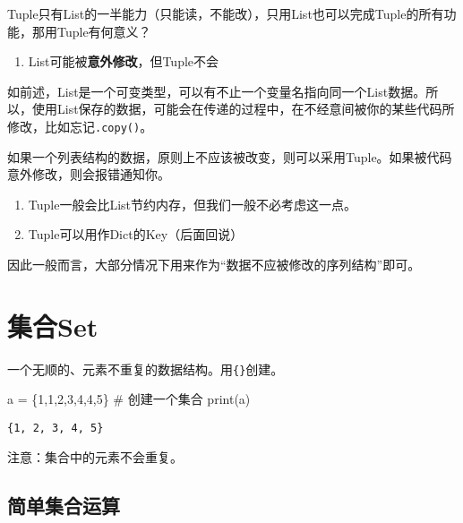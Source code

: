 \documentclass[
  letterpaper,
  DIV=11,
  numbers=noendperiod]{scrreprt}
\newenvironment{Shaded}{\begin{snugshade}}{\end{snugshade}}
\newcommand{\BuiltInTok}[1]{\textcolor[rgb]{0.00,0.23,0.31}{#1}}
\newcommand{\CommentTok}[1]{\textcolor[rgb]{0.37,0.37,0.37}{#1}}
\newcommand{\DecValTok}[1]{\textcolor[rgb]{0.68,0.00,0.00}{#1}}
\newcommand{\NormalTok}[1]{\textcolor[rgb]{0.00,0.23,0.31}{#1}}
\newcommand{\OperatorTok}[1]{\textcolor[rgb]{0.37,0.37,0.37}{#1}}
\providecommand{\tightlist}{%
  \setlength{\itemsep}{0pt}\setlength{\parskip}{0pt}}\usepackage{longtable,booktabs,array}
\begin{document}
Tuple只有List的一半能力（只能读，不能改），只用List也可以完成Tuple的所有功能，那用Tuple有何意义？

\begin{enumerate}
\def\labelenumi{\arabic{enumi}.}
\tightlist
\item
  List可能被\textbf{意外修改}，但Tuple不会
\end{enumerate}

如前述，List是一个可变类型，可以有不止一个变量名指向同一个List数据。所以，使用List保存的数据，可能会在传递的过程中，在不经意间被你的某些代码所修改，比如忘记\texttt{.copy()}。

如果一个列表结构的数据，原则上不应该被改变，则可以采用Tuple。如果被代码意外修改，则会报错通知你。

\begin{enumerate}
\def\labelenumi{\arabic{enumi}.}
\setcounter{enumi}{1}
\item
  Tuple一般会比List节约内存，但我们一般不必考虑这一点。
\item
  Tuple可以用作Dict的Key（后面回说）
\end{enumerate}

因此一般而言，大部分情况下用来作为``数据不应被修改的序列结构''即可。

\hypertarget{ux96c6ux5408set}{%
\section{集合Set}\label{ux96c6ux5408set}}

一个无顺的、元素不重复的数据结构。用\texttt{\{\}}创建。

\begin{Shaded}
\begin{Highlighting}[]
\NormalTok{a }\OperatorTok{=}\NormalTok{ \{}\DecValTok{1}\NormalTok{,}\DecValTok{1}\NormalTok{,}\DecValTok{2}\NormalTok{,}\DecValTok{3}\NormalTok{,}\DecValTok{4}\NormalTok{,}\DecValTok{4}\NormalTok{,}\DecValTok{5}\NormalTok{\} }\CommentTok{\# 创建一个集合}
\BuiltInTok{print}\NormalTok{(a)}
\end{Highlighting}
\end{Shaded}

\begin{verbatim}
{1, 2, 3, 4, 5}
\end{verbatim}

注意：集合中的元素不会重复。

\hypertarget{ux7b80ux5355ux96c6ux5408ux8fd0ux7b97}{%
\subsection{简单集合运算}\label{ux7b80ux5355ux96c6ux5408ux8fd0ux7b97}}
\end{document}

